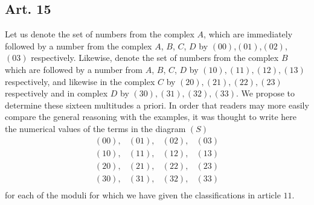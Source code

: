 \documentclass{book}
\theoremstyle{plain}
\theoremstyle{remark}
\begin{document}
\subsection*{Art. 15}

Let us denote the set of numbers from the complex $A$, which are immediately followed by a number from the complex $A$, $B$, $C$, $D$ by $(00)$,$(01)$,$(02)$,$(03)$ respectively.  Likewise, denote the set of numbers from the complex $B$ which are followed by a number from $A$, $B$, $C$, $D$ by $(10),(11),(12),(13)$ respectively, and likewise in the complex $C$ by $(20),(21),(22),(23)$ respectively and in complex $D$ by $(30),(31),(32),(33)$.  We propose to determine these sixteen multitudes a priori.  In order that readers may more easily compare the general reasoning with the examples, it was thought to write here the numerical values of the terms in the diagram $(S)$
\[ \begin{array}{llll}
(00),&(01),&(02),&(03)\\
(10),&(11),&(12),&(13)\\
(20),&(21),&(22),&(23)\\
(30),&(31),&(32),&(33)\\
\end{array} \]
for each of the moduli for which we have given the classifications in article $11$.
\end{document}
